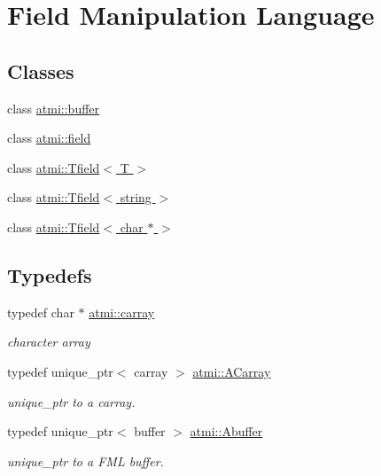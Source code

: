\hypertarget{group__fml}{\section{Field Manipulation Language}
\label{group__fml}
}
\subsection*{Classes}
\begin{DoxyCompactItemize}
\item 
class \hyperlink{classatmi_1_1buffer}{atmi\+::buffer}
\item 
class \hyperlink{classatmi_1_1field}{atmi\+::field}
\item 
class \hyperlink{classatmi_1_1_tfield}{atmi\+::\+Tfield$<$ T $>$}
\item 
class \hyperlink{classatmi_1_1_tfield_3_01string_01_4}{atmi\+::\+Tfield$<$ string $>$}
\item 
class \hyperlink{classatmi_1_1_tfield_3_01char_01_5_01_4}{atmi\+::\+Tfield$<$ char $\ast$ $>$}
\end{DoxyCompactItemize}
\subsection*{Typedefs}
\begin{DoxyCompactItemize}
\item 
\hypertarget{group__fml_ga8b57f9a4e2453d8e5d82ac0016e35e87}{typedef char $\ast$ \hyperlink{group__fml_ga8b57f9a4e2453d8e5d82ac0016e35e87}{atmi\+::carray}}\label{group__fml_ga8b57f9a4e2453d8e5d82ac0016e35e87}

\begin{DoxyCompactList}\small\item\em character array \end{DoxyCompactList}\item 
\hypertarget{group__fml_ga374230d2a2355a879f42c829eb2d70ff}{typedef unique\+\_\+ptr$<$ carray $>$ \hyperlink{group__fml_ga374230d2a2355a879f42c829eb2d70ff}{atmi\+::\+A\+Carray}}\label{group__fml_ga374230d2a2355a879f42c829eb2d70ff}

\begin{DoxyCompactList}\small\item\em unique\+\_\+ptr to a carray. \end{DoxyCompactList}\item 
\hypertarget{group__fml_ga268bae34ffaa2c2e72fabbcb54841934}{typedef unique\+\_\+ptr$<$ buffer $>$ \hyperlink{group__fml_ga268bae34ffaa2c2e72fabbcb54841934}{atmi\+::\+Abuffer}}\label{group__fml_ga268bae34ffaa2c2e72fabbcb54841934}

\begin{DoxyCompactList}\small\item\em unique\+\_\+ptr to a F\+M\+L buffer. \end{DoxyCompactList}\end{DoxyCompactItemize}
